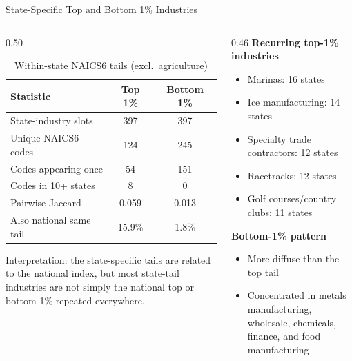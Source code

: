 \documentclass[aspectratio=169]{beamer}
\begin{document}
\begin{frame}{State-Specific Top and Bottom 1\% Industries}
  \begin{columns}
    \begin{column}{0.50\textwidth}
      \begin{table}
        \footnotesize
        \caption{Within-state NAICS6 tails (excl.\ agriculture)}
        \begin{tabular}{lcc}
          \toprule
          Statistic & Top 1\% & Bottom 1\% \\
          \midrule
          State-industry slots & 397 & 397 \\
          Unique NAICS6 codes & 124 & 245 \\
          Codes appearing once & 54 & 151 \\
          Codes in 10+ states & 8 & 0 \\
          Pairwise Jaccard & 0.059 & 0.013 \\
          Also national same tail & 15.9\% & 1.8\% \\
          \bottomrule
        \end{tabular}
      \end{table}
      \vspace{0.4em}
      {\small
      Interpretation: the state-specific tails are related to the national index,
      but most state-tail industries are not simply the national top or bottom
      1\% repeated everywhere.}
    \end{column}
    \begin{column}{0.46\textwidth}
      \footnotesize
      \textbf{Recurring top-1\% industries}
      \begin{itemize}
        \item Marinas: 16 states
        \item Ice manufacturing: 14 states
        \item Specialty trade contractors: 12 states
        \item Racetracks: 12 states
        \item Golf courses/country clubs: 11 states
      \end{itemize}
      \medskip
      \textbf{Bottom-1\% pattern}
      \begin{itemize}
        \item More diffuse than the top tail
        \item Concentrated in metals manufacturing, wholesale,
              chemicals, finance, and food manufacturing
      \end{itemize}
    \end{column}
  \end{columns}
\end{frame}
\end{document}

